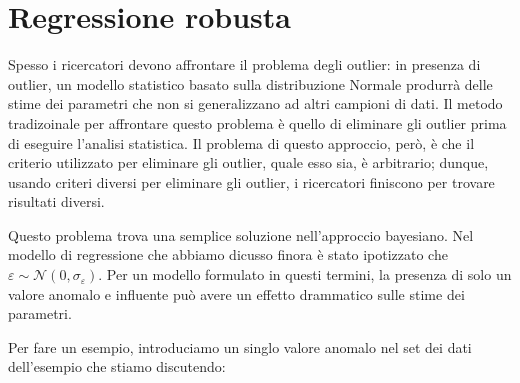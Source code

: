 \documentclass[
  10pt,
  italian,
  a4paper,
  extrafontsizes,onecolumn,openright
  ]{memoir}
\newenvironment{Shaded}{\begin{snugshade}}{\end{snugshade}}
\newcommand{\CommentTok}[1]{\textcolor[rgb]{0.56,0.35,0.01}{\textit{#1}}}
\newcommand{\DecValTok}[1]{\textcolor[rgb]{0.00,0.00,0.81}{#1}}
\newcommand{\FunctionTok}[1]{\textcolor[rgb]{0.00,0.00,0.00}{#1}}
\newcommand{\NormalTok}[1]{#1}
\newcommand{\OtherTok}[1]{\textcolor[rgb]{0.56,0.35,0.01}{#1}}
\newcommand{\SpecialCharTok}[1]{\textcolor[rgb]{0.00,0.00,0.00}{#1}}
\begin{document}
\begin{Shaded}
\end{Shaded}

\hypertarget{regressione-robusta}{%
\section{Regressione robusta}\label{regressione-robusta}}

Spesso i ricercatori devono affrontare il problema degli outlier: in presenza di outlier, un modello statistico basato sulla distribuzione Normale produrrà delle stime dei parametri che non si generalizzano ad altri campioni di dati. Il metodo tradizoinale per affrontare questo problema è quello di eliminare gli outlier prima di eseguire l'analisi statistica. Il problema di questo approccio, però, è che il criterio utilizzato per eliminare gli outlier, quale esso sia, è arbitrario; dunque, usando criteri diversi per eliminare gli outlier, i ricercatori finiscono per trovare risultati diversi.

Questo problema trova una semplice soluzione nell'approccio bayesiano. Nel modello di regressione che abbiamo dicusso finora è stato ipotizzato che \(\varepsilon \sim \mathcal{N}(0, \sigma_{\varepsilon})\). Per un modello formulato in questi termini, la presenza di solo un valore anomalo e influente può avere un effetto drammatico sulle stime dei parametri.

Per fare un esempio, introduciamo un singlo valore anomalo nel set dei dati dell'esempio che stiamo discutendo:

\begin{Shaded}
\end{Shaded}
\end{document}

